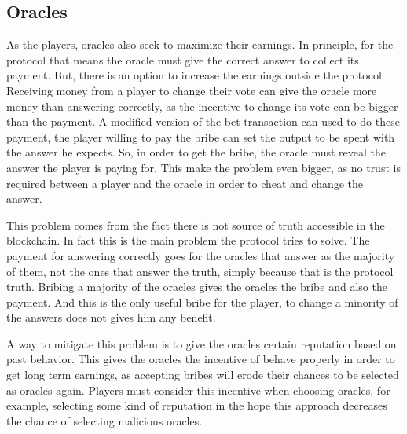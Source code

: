 \subsection{Oracles} \label{subsec:inc_oracles}

As the players, oracles also seek to maximize their earnings.
In principle, for the protocol that means the oracle must give the correct
  answer to collect its payment.
But, there is an option to increase the earnings outside the protocol. Receiving
  money from a player to change their vote can give the oracle more money than
  answering correctly, as the incentive to change its vote can be bigger than
  the payment.
A modified version of the bet transaction can used to do these payment, the
  player willing to pay the bribe can set the output to be spent with the answer
  he expects.
So, in order to get the bribe, the oracle must reveal the answer the player is
  paying for.
This make the problem even bigger, as no trust is required between a player and
  the oracle in order to cheat and change the answer.

This problem comes from the fact there is not source of truth accessible in the
  blockchain.
In fact this is the main problem the protocol tries to solve.
The payment for answering correctly goes for the oracles that answer as the
  majority of them, not the ones that answer the truth, simply because that is
  the protocol truth.
Bribing a majority of the oracles gives the oracles the bribe and also the
  payment.
And this is the only useful bribe for the player, to change a minority of the
  answers does not gives him any benefit.

A way to mitigate this problem is to give the oracles certain reputation based
  on past behavior.
This gives the oracles the incentive of behave properly in order to get long
  term earnings, as accepting bribes will erode their chances to be selected as
  oracles again.
Players must consider this incentive when choosing oracles, for example,
  selecting some kind of reputation in the hope this approach decreases the
  chance of selecting malicious oracles.
